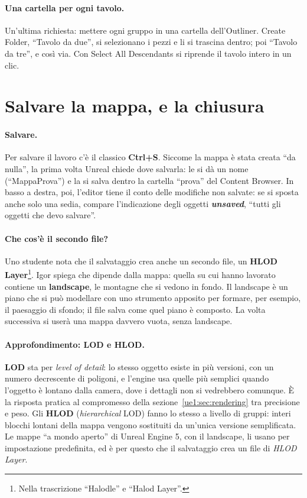 \paragraph{Una cartella per ogni tavolo.} Un'ultima richiesta: mettere ogni gruppo in una
cartella dell'Outliner. Create Folder, ``Tavolo da due'', si selezionano i pezzi e li si
trascina dentro; poi ``Tavolo da tre'', e così via. Con Select All Descendants si
riprende il tavolo intero in un clic.

\section{Salvare la mappa, e la chiusura}
\label{ue1:sec:chiusura}

\paragraph{Salvare.} Per salvare il lavoro c'è il classico \textbf{Ctrl+S}. Siccome la
mappa è stata creata ``da nulla'', la prima volta Unreal chiede dove salvarla: le si dà
un nome (``MappaProva'') e la si salva dentro la cartella ``prova'' del Content
Browser. In basso a destra, poi, l'editor tiene il conto delle modifiche non salvate:
se si sposta anche solo una sedia, compare l'indicazione degli oggetti
\textbf{\emph{unsaved}}, ``tutti gli oggetti che devo salvare''.

\paragraph{Che cos'è il secondo file?} Uno studente nota che il salvataggio crea anche un
secondo file, un \textbf{HLOD Layer}\footnote{Nella trascrizione ``Halodle'' e ``Halod
Layer''.}. Igor spiega che dipende dalla mappa: quella su cui hanno lavorato contiene un
\textbf{landscape}, le montagne che si vedono in fondo. Il landscape è un piano che si
può modellare con uno strumento apposito per formare, per esempio, il paesaggio di
sfondo; il file salva come quel piano è composto. La volta successiva si userà una
mappa davvero vuota, senza landscape.

\paragraph{Approfondimento: LOD e HLOD.} \textbf{LOD} sta per \emph{level of detail}:
lo stesso oggetto esiste in più versioni, con un numero decrescente di poligoni, e
l'engine usa quelle più semplici quando l'oggetto è lontano dalla camera, dove i
dettagli non si vedrebbero comunque. È la risposta pratica al compromesso della
sezione~\ref{ue1:sec:rendering} tra precisione e peso. Gli \textbf{HLOD}
(\emph{hierarchical} LOD) fanno lo stesso a livello di gruppi: interi blocchi lontani
della mappa vengono sostituiti da un'unica versione semplificata. Le mappe ``a mondo
aperto'' di Unreal Engine 5, con il landscape, li usano per impostazione predefinita, ed
è per questo che il salvataggio crea un file di \emph{HLOD Layer}.

